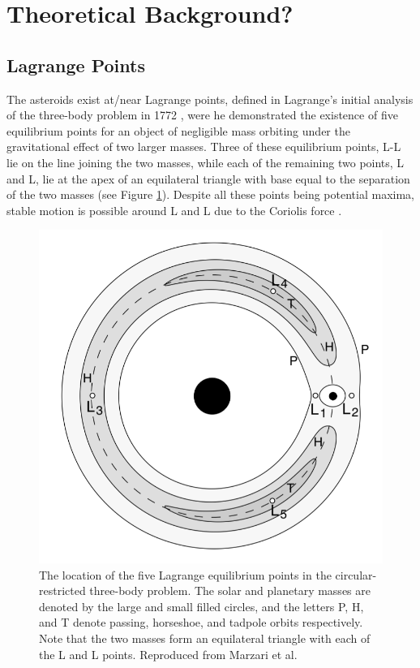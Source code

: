 \documentclass[11pt, a4paper,twocolumn]{article} %
\begin{document}

\section{Theoretical Background?}

\subsection{Lagrange Points}
The asteroids exist at/near Lagrange points, defined in Lagrange's initial analysis of the three-body problem in 1772 \cite{Lagrange1772}, were he demonstrated the existence of five equilibrium points for an object of negligible mass orbiting under the gravitational effect of two larger masses. Three of these equilibrium points, L-L lie on the line joining the two masses, while each of the remaining two points, L and L, lie at the apex of an equilateral triangle with base equal to the separation of the two masses (see Figure \ref{fig:lagrangepoints}). Despite all these points being potential maxima, stable motion is possible around L and L due to the Coriolis force \cite{Lissauer2014}.

\begin{figure}[h]
	\centering
	\includegraphics[width=\linewidth]{Figures/lagrange_points}
	\caption{The location of the five Lagrange equilibrium points in the circular-restricted three-body problem. The solar and planetary masses are denoted by the large and small filled circles, and the letters P, H, and T denote passing, horseshoe, and tadpole orbits respectively. Note that the two masses form an equilateral triangle with each of the L and L points. Reproduced from Marzari et al. \cite{Marzari2002}}
	\label{fig:lagrangepoints}
\end{figure}
\end{document}
